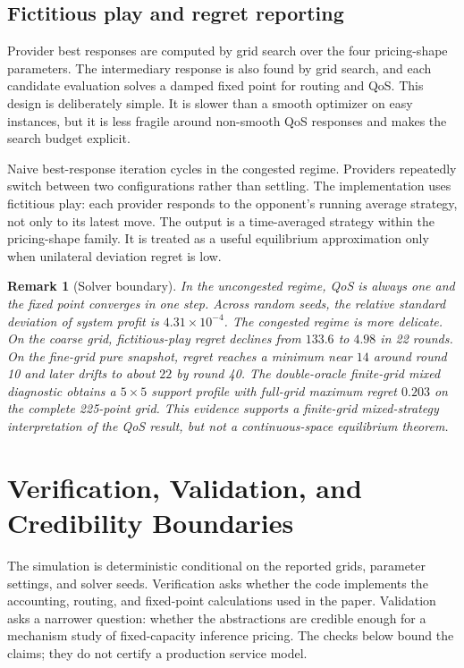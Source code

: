 \documentclass[11pt,a4paper]{article}
\newtheorem{remark}{Remark}
\begin{document}
\subsection{Fictitious play and regret reporting}

Provider best responses are computed by grid search over the four pricing-shape parameters. The intermediary response is also found by grid search, and each candidate evaluation solves a damped fixed point for routing and QoS. This design is deliberately simple. It is slower than a smooth optimizer on easy instances, but it is less fragile around non-smooth QoS responses and makes the search budget explicit.

Naive best-response iteration cycles in the congested regime. Providers repeatedly switch between two configurations rather than settling. The implementation uses fictitious play: each provider responds to the opponent's running average strategy, not only to its latest move. The output is a time-averaged strategy within the pricing-shape family. It is treated as a useful equilibrium approximation only when unilateral deviation regret is low.

\begin{remark}[Solver boundary]
In the uncongested regime, QoS is always one and the fixed point converges in one step. Across random seeds, the relative standard deviation of system profit is $4.31\times10^{-4}$. The congested regime is more delicate. On the coarse grid, fictitious-play regret declines from $133.6$ to $4.98$ in 22 rounds. On the fine-grid pure snapshot, regret reaches a minimum near $14$ around round 10 and later drifts to about $22$ by round 40. The double-oracle finite-grid mixed diagnostic obtains a $5\times5$ support profile with full-grid maximum regret $0.203$ on the complete 225-point grid. This evidence supports a finite-grid mixed-strategy interpretation of the QoS result, but not a continuous-space equilibrium theorem.
\end{remark}

\section{Verification, Validation, and Credibility Boundaries}
\label{sec:vv}

The simulation is deterministic conditional on the reported grids, parameter settings, and solver seeds. Verification asks whether the code implements the accounting, routing, and fixed-point calculations used in the paper. Validation asks a narrower question: whether the abstractions are credible enough for a mechanism study of fixed-capacity inference pricing. The checks below bound the claims; they do not certify a production service model.
\end{document}
